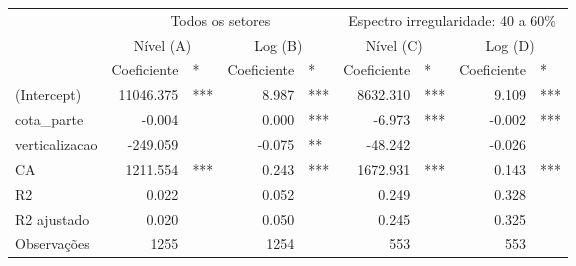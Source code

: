 \begingroup
\fontsize{10.5pt}{12.6pt}\selectfont
\begin{longtable}{lrlrlrlrl}
\toprule
 & \multicolumn{4}{c}{Todos os setores} & \multicolumn{4}{c}{Espectro irregularidade: 40 a 60\%} \\ 
\cmidrule(lr){2-5} \cmidrule(lr){6-9}
 & \multicolumn{2}{c}{Nível (A)    } & \multicolumn{2}{c}{Log (B)    } & \multicolumn{2}{c}{Nível (C)    } & \multicolumn{2}{c}{Log (D)    } \\ 
\cmidrule(lr){2-3} \cmidrule(lr){4-5} \cmidrule(lr){6-7} \cmidrule(lr){8-9}
  & Coeficiente & * & Coeficiente  & *  & Coeficiente   & *   & Coeficiente    & *    \\ 
\midrule\addlinespace[2.5pt]
(Intercept) & 11046.375 & *** & 8.987 & *** & 8632.310 & *** & 9.109 & *** \\ 
cota\_parte & -0.004 &  & 0.000 & *** & -6.973 & *** & -0.002 & *** \\ 
verticalizacao & -249.059 &  & -0.075 & ** & -48.242 &  & -0.026 &  \\ 
CA & 1211.554 & *** & 0.243 & *** & 1672.931 & *** & 0.143 & *** \\ 
{R2} & {0.022} & {} & {0.052} & {} & {0.249} & {} & {0.328} & {} \\ 
R2 ajustado & 0.020 &  & 0.050 &  & 0.245 &  & 0.325 &  \\ 
Observações & 1255 &  & 1254 &  & 553 &  & 553 &  \\ 
\bottomrule
\end{longtable}
\endgroup

